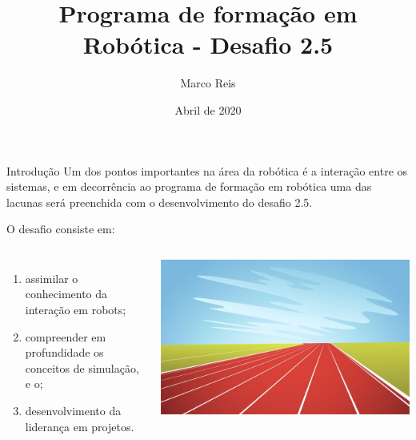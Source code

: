 \documentclass[aspectratio=169]{beamer}
\title              {Programa de formação em Robótica - Desafio 2.5}
\author             {Marco Reis}
\institute          {Laboratório de Robótica e Sistemas Autônomos, Senai Cimatec}
\date               {Abril de 2020}
\begin{document}
\begin{frame}[t,plain]
    \titlepage
\end{frame}
\begin{frame}[t]{Introdução} 
    Um dos pontos importantes na área da robótica é a interação entre os sistemas, e em decorrência ao programa de formação em robótica uma das lacunas será preenchida com o desenvolvimento do desafio 2.5.
    
    O desafio consiste em:
    \newline
        \begin{columns}[c]
                \begin{enumerate}
                    \item assimilar o conhecimento da interação em robots;
                    \item compreender em profundidade os conceitos de simulação, e o;
                    \item desenvolvimento da liderança em projetos.
                \end{enumerate}
                \includegraphics[width=1\textwidth]{pista}
        \end{columns}
    \end{frame}
\end{document}

